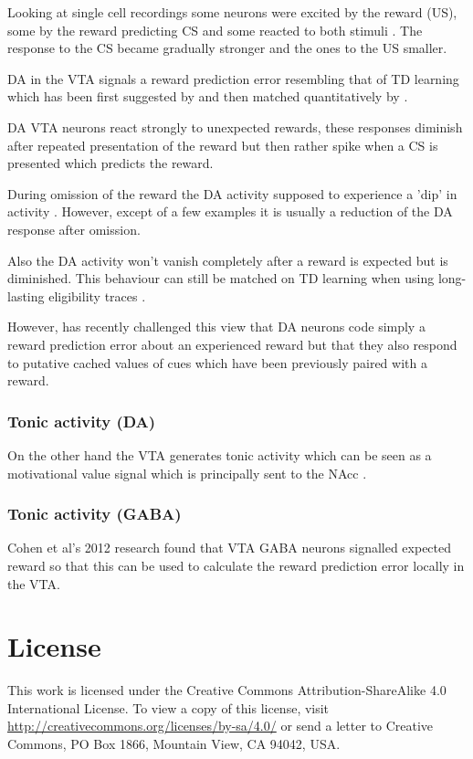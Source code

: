 \documentclass[12pt,a4paper]{article}
\begin{document}
Looking at single cell recordings some neurons were excited by the reward (US), some by the reward predicting CS and some reacted to both stimuli \citep{Cohen2012}. The response to the CS became gradually stronger and the ones to the US smaller.

DA in the VTA signals a reward prediction error resembling that of TD learning which has been first suggested by \citep{Schultz1997} and then matched quantitatively by \citep{Bayer2005}.

DA VTA neurons react strongly to unexpected rewards, these responses diminish after repeated presentation of the reward but then rather spike when a CS is presented which predicts the reward. 

During omission of the reward the DA activity supposed to experience a 'dip' in activity \citep{Takahashi2017}. However, except of a few examples it is usually a reduction of the DA response after omission. 

Also the DA activity won't vanish completely after a reward is expected but is diminished. This behaviour can still be matched on TD learning when using long-lasting eligibility traces \citep{Pan2005}.

However, \citep{Sadacca2016} has recently challenged this view that DA neurons code simply a reward prediction error about an experienced reward but that they also respond to putative cached values of cues which have been previously paired with a reward.

\subsubsection{Tonic activity (DA)}

On the other hand the VTA generates tonic activity which can be seen as a motivational value signal which is principally sent to the NAcc \citep{Sesack2010}\citep{Bromberg-Martin2010} .

\subsubsection{Tonic activity (GABA)}

Cohen et al’s 2012 research found that VTA GABA neurons signalled expected reward \citep{Cohen2012} so that this can be used to calculate the reward prediction error locally in the VTA.


\appendix

\section*{License}

This work is licensed under the Creative Commons
Attribution-ShareAlike 4.0 International License. To view a copy of
this license, visit
\url{http://creativecommons.org/licenses/by-sa/4.0/} or send a letter
to Creative Commons, PO Box 1866, Mountain View, CA 94042, USA.




\end{document}
